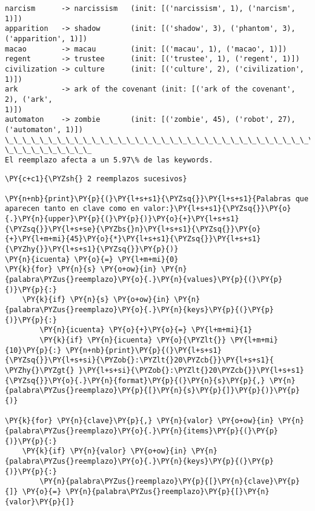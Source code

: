     \begin{Verbatim}[commandchars=\\\{\}]
narcism      -> narcissism   (init: [('narcissism', 1), ('narcism', 1)])
apparition   -> shadow       (init: [('shadow', 3), ('phantom', 3),
('apparition', 1)])
macao        -> macau        (init: [('macau', 1), ('macao', 1)])
regent       -> trustee      (init: [('trustee', 1), ('regent', 1)])
civilization -> culture      (init: [('culture', 2), ('civilization', 1)])
ark          -> ark of the covenant (init: [('ark of the covenant', 2), ('ark',
1)])
automaton    -> zombie       (init: [('zombie', 45), ('robot', 27),
('automaton', 1)])
\_\_\_\_\_\_\_\_\_\_\_\_\_\_\_\_\_\_\_\_\_\_\_\_\_\_\_\_\_\_\_\_\_\_\_\_\_\_\_\_\_\_\_\_\_\_\_\_\_\_\_\_\_\_\_\_\_\_\_\_\_\_\_\_\_\_\_\_\_\_\_\_\_\_\_\_\_\_\_\_
\_\_\_\_\_\_\_\_\_\_
El reemplazo afecta a un 5.97\% de las keywords.
    \end{Verbatim}

    \begin{tcolorbox}[breakable, size=fbox, boxrule=1pt, pad at break*=1mm,colback=cellbackground, colframe=cellborder]
\begin{Verbatim}[commandchars=\\\{\}]
\PY{c+c1}{\PYZsh{} 2 reemplazos sucesivos}

\PY{n+nb}{print}\PY{p}{(}\PY{l+s+s1}{\PYZsq{}}\PY{l+s+s1}{Palabras que aparecen tanto en clave como en valor:}\PY{l+s+s1}{\PYZsq{}}\PY{o}{.}\PY{n}{upper}\PY{p}{(}\PY{p}{)}\PY{o}{+}\PY{l+s+s1}{\PYZsq{}}\PY{l+s+se}{\PYZbs{}n}\PY{l+s+s1}{\PYZsq{}}\PY{o}{+}\PY{l+m+mi}{45}\PY{o}{*}\PY{l+s+s1}{\PYZsq{}}\PY{l+s+s1}{\PYZhy{}}\PY{l+s+s1}{\PYZsq{}}\PY{p}{)}
\PY{n}{icuenta} \PY{o}{=} \PY{l+m+mi}{0}
\PY{k}{for} \PY{n}{s} \PY{o+ow}{in} \PY{n}{palabra\PYZus{}reemplazo}\PY{o}{.}\PY{n}{values}\PY{p}{(}\PY{p}{)}\PY{p}{:}
    \PY{k}{if} \PY{n}{s} \PY{o+ow}{in} \PY{n}{palabra\PYZus{}reemplazo}\PY{o}{.}\PY{n}{keys}\PY{p}{(}\PY{p}{)}\PY{p}{:}
        \PY{n}{icuenta} \PY{o}{+}\PY{o}{=} \PY{l+m+mi}{1}
        \PY{k}{if} \PY{n}{icuenta} \PY{o}{\PYZlt{}} \PY{l+m+mi}{10}\PY{p}{:} \PY{n+nb}{print}\PY{p}{(}\PY{l+s+s1}{\PYZsq{}}\PY{l+s+si}{\PYZob{}:\PYZlt{}20\PYZcb{}}\PY{l+s+s1}{ \PYZhy{}\PYZgt{} }\PY{l+s+si}{\PYZob{}:\PYZlt{}20\PYZcb{}}\PY{l+s+s1}{\PYZsq{}}\PY{o}{.}\PY{n}{format}\PY{p}{(}\PY{n}{s}\PY{p}{,} \PY{n}{palabra\PYZus{}reemplazo}\PY{p}{[}\PY{n}{s}\PY{p}{]}\PY{p}{)}\PY{p}{)}

\PY{k}{for} \PY{n}{clave}\PY{p}{,} \PY{n}{valor} \PY{o+ow}{in} \PY{n}{palabra\PYZus{}reemplazo}\PY{o}{.}\PY{n}{items}\PY{p}{(}\PY{p}{)}\PY{p}{:}
    \PY{k}{if} \PY{n}{valor} \PY{o+ow}{in} \PY{n}{palabra\PYZus{}reemplazo}\PY{o}{.}\PY{n}{keys}\PY{p}{(}\PY{p}{)}\PY{p}{:}
        \PY{n}{palabra\PYZus{}reemplazo}\PY{p}{[}\PY{n}{clave}\PY{p}{]} \PY{o}{=} \PY{n}{palabra\PYZus{}reemplazo}\PY{p}{[}\PY{n}{valor}\PY{p}{]}                    
\end{Verbatim}
\end{tcolorbox}


